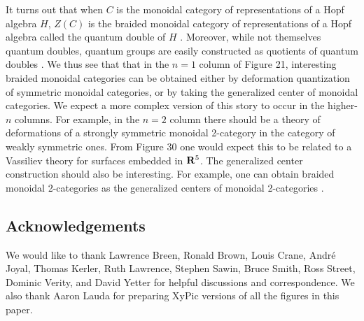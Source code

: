 It turns out that when $C$ is the monoidal category of
representations of a Hopf algebra $H$, $Z(C)$ is the braided
monoidal category of representations of a Hopf algebra called the
quantum double of $H$ \cite{CP}.  Moreover, while not themselves
quantum doubles, quantum groups are easily constructed as
quotients of quantum doubles \cite{CP}.  We thus see that that in
the $n = 1$ column of Figure 21, interesting braided monoidal
categories can be obtained either by deformation quantization of
symmetric monoidal categories, or by taking the generalized
center of monoidal categories.  We expect a more complex version
of this story to occur in the higher-$n$ columns.   For example,
in the $n = 2$ column there should be a theory of deformations of a
strongly symmetric monoidal 2-category in the category of weakly
symmetric ones.  From Figure 30 one would expect this to be
related to a Vassiliev theory for surfaces embedded in ${\bf R}^5$.
The generalized center construction should also be interesting.
For example, one can obtain braided monoidal
2-categories as the generalized centers of monoidal 2-categories
\cite{BHN}.












\subsection*{Acknowledgements}

We would like to thank Lawrence Breen, Ronald Brown, Louis Crane,
Andr\'e Joyal, Thomas Kerler, Ruth Lawrence, Stephen Sawin, Bruce
Smith, Ross Street, Dominic Verity, and David Yetter for helpful
discussions and correspondence.  We also thank Aaron Lauda for
preparing XyPic versions of all the figures in this paper.


